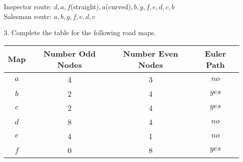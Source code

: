 \documentclass{article}
\begin{document}
\begin{itemize}
\begin{center}
\begin{tikzpicture}
            \end{tikzpicture}
    \end{center}
    
    {\color{blue}
    Inspector route: $d,a,f$(straight)$,a$(curved)$,b,g,f,e,d,c,b$\\
    Salesman route: $a,b,g,f,e,d,c$}
    
    \item[3.] Complete the table for the following road maps.
    
    \begin{center}
\begin{tabular}{|c|c|c|c|}
    \hline
    Map & Number Odd Nodes & Number Even Nodes & Euler Path\\
    \hline
    $a$ & 4 & 3 & $no$\\
    \hline
    $b$ & 2 & 4 & $yes$\\
    \hline
    $c$ & 2 & 4 & $yes$\\
    \hline
    $d$ & 8 & 4 & $no$\\
    \hline
    $e$ & 4 & 1 & $no$\\
    \hline
    $f$ & 0 & 8 & $yes$\\
    \hline
\end{tabular}
    \end{center}
\end{itemize}
\end{document}
